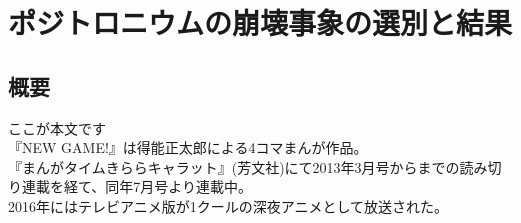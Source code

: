 \chapter{ポジトロニウムの崩壊事象の選別と結果}\label{result}

\section{概要}
ここが本文です\\
『NEW GAME!』は得能正太郎による4コマまんが作品。\\
『まんがタイムきららキャラット』(芳文社)にて2013年3月号からまでの読み切り連載を経て、同年7月号より連載中。\\[1pt]
2016年にはテレビアニメ版が1クールの深夜アニメとして放送された。
